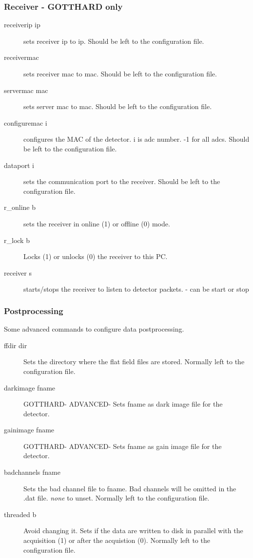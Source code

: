 \documentclass{article}
\begin{document}
\subsubsection{Receiver -  GOTTHARD only}
\begin{description}
 \item[receiverip ip] sets receiver ip to ip. Should be left to the configuration file. 
\item[receivermac] sets receiver mac to mac. Should be left to the configuration file. 
\item[servermac mac] sets server mac to mac. Should be left to the configuration file. 
\item[configuremac i] configures the MAC of the detector. i is adc number. -1 for all adcs.  Should be left to the configuration file. 
\item[dataport i]   sets the communication port to the receiver. Should be left to the configuration file. 
\item[r\_online b] sets the receiver in online (1) or offline (0) mode.           
\item[r\_lock b] Locks (1) or unlocks (0) the receiver to this PC.   
\item[receiver s ] starts/stops the receiver to listen to detector packets. - can be start or stop   
\end{description} 

\subsubsection{Postprocessing}
Some advanced commands to configure data postprocessing.
\begin{description}      
\item[ffdir dir] Sets the directory where the flat field files are stored. Normally left to the configuration file.
\item[darkimage fname] GOTTHARD- ADVANCED- Sets fname as dark image file for the detector.       
\item[gainimage fname] GOTTHARD- ADVANCED- Sets fname as gain image file for the detector. 
\item[badchannels fname] Sets the bad channel file to fname. Bad channels will be omitted in the .dat file.  \textit{none} to unset.  Normally left to the configuration file.   
\item[threaded b] Avoid changing it. Sets if the data are written to disk in parallel with the acquisition (1) or after the acquistion (0).    Normally left to the configuration file.      
\end{description}
\end{document}
